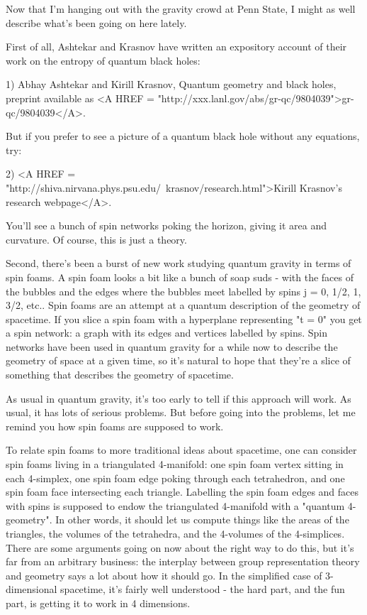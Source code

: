

Now that I'm hanging out with the gravity crowd at Penn State, I might
as well describe what's been going on here lately.

First of all, Ashtekar and Krasnov have written an expository account
of their work on the entropy of quantum black holes:

1) Abhay Ashtekar and Kirill Krasnov, Quantum geometry and black holes, 
preprint available as 
<A HREF = "http://xxx.lanl.gov/abs/gr-qc/9804039">gr-qc/9804039</A>.

But if you prefer to see a picture of a quantum black hole
without any equations, try:

2) <A HREF = "http://shiva.nirvana.phys.psu.edu/~krasnov/research.html">Kirill
Krasnov's research webpage</A>.

You'll see a bunch of spin networks poking the horizon, giving it
area and curvature.  Of course, this is just a theory.  

Second, there's been a burst of new work studying quantum gravity in
terms of spin foams.  A spin foam looks a bit like a bunch of soap
suds - with the faces of the bubbles and the edges where the bubbles
meet labelled by spins j = 0, 1/2, 1, 3/2, etc..  Spin foams are an
attempt at a quantum description of the geometry of
spacetime.  If you slice a spin foam with a hyperplane representing 
"t = 0" you get a spin network: a graph with its edges and vertices
labelled by spins.  Spin networks have been used in quantum gravity
for a while now to describe the geometry of space at a given time, so
it's natural to hope that they're a slice of something that describes
the geometry of spacetime.

As usual in quantum gravity, it's too early to tell if this approach
will work.  As usual, it has lots of serious problems.  But before
going into the problems, let me remind you how spin foams are supposed
to work.

To relate spin foams to more traditional ideas about spacetime, one
can consider spin foams living in a triangulated 4-manifold: one spin
foam vertex sitting in each 4-simplex, one spin foam edge poking
through each tetrahedron, and one spin foam face intersecting each
triangle.  Labelling the spin foam edges and faces with spins is
supposed to endow the triangulated 4-manifold with a "quantum
4-geometry".  In other words, it should let us compute things like the
areas of the triangles, the volumes of the tetrahedra, and the
4-volumes of the 4-simplices.  There are some arguments going on now
about the right way to do this, but it's far from an arbitrary
business: the interplay between group representation theory and
geometry says a lot about how it should go.  In the simplified case of
3-dimensional spacetime, it's fairly well understood - the hard
part, and the fun part, is getting it to work in 4 dimensions.

